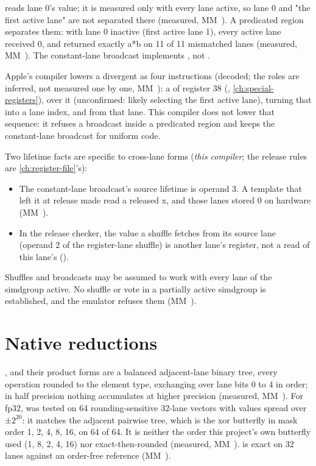  reads lane 0's value; it is measured only with every lane active, so lane 0
and "the first active lane" are not separated there (measured, MM~). A predicated region separates them: with lane 0 inactive
(first active lane 1), every active lane received 0, and  returned exactly a*b on 11 of 11
mismatched lanes (measured, MM~). The constant-lane broadcast implements , not
.

Apple's compiler lowers a divergent  as four instructions (decoded; the roles are inferred, not measured
one by one, MM~): a  of register 38 (, \cref{ch:special-registers}),  over it (unconfirmed: likely selecting the first active lane),  turning
that into a lane index, and  from that lane. This compiler does not lower that
sequence: it refuses a broadcast inside a predicated region and keeps the constant-lane broadcast for uniform code.

Two lifetime facts are specific to cross-lane forms (\emph{this compiler}; the release rules are \cref{ch:register-file}'s):

\begin{itemize}
\item The constant-lane broadcast's source lifetime is operand 3. A template that left it at release made
   read a released x, and those lanes stored 0 on hardware (MM~).
\item In the release checker, the value a shuffle fetches from its source lane (operand 2 of the register-lane shuffle) is
  another lane's register, not a read of this lane's ().
\end{itemize}

Shuffles and broadcasts may be assumed to work with every lane of the simdgroup active. No shuffle or vote in a
partially active simdgroup is established, and the emulator refuses them (MM~).

\section{Native reductions}\label{sec:native-reductions}

,  and their product forms are a balanced adjacent-lane binary tree, every operation rounded to the
element type, exchanging over lane bits 0 to 4 in order; in half precision nothing accumulates at higher precision
(measured, MM~). For fp32,  was tested on 64 rounding-sensitive 32-lane vectors with values spread
over ±$2^{20}$: it matches the adjacent pairwise tree, which is the xor butterfly in mask order 1, 2, 4, 8, 16, on 64 of 64. It
is neither the order this project's own butterfly used (1, 8, 2, 4, 16) nor exact-then-rounded (measured, MM~).  is exact on 32 lanes against an order-free reference (MM~).

